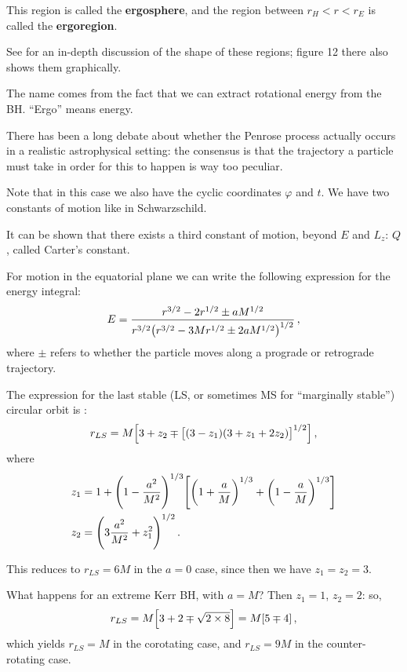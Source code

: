 \documentclass[main.tex]{subfiles}
\begin{document}
This region is called the \textbf{ergosphere}, and the region between \(r_H < r < r_E\) is called the \textbf{ergoregion}. 

See \textcite[sec. 3]{heinickeSchwarzschildKerrSolutions2015} for an in-depth discussion of the shape of these regions; figure 12 there also shows them graphically. 

The name comes from the fact that we can extract rotational energy from the BH. 
``Ergo'' means energy. 

There has been a long debate about whether the Penrose process actually occurs in a realistic astrophysical setting: the consensus is that the trajectory a particle must take in order for this to happen is way too peculiar. 

Note that in this case we also have the cyclic coordinates \(\varphi \) and \(t\). We have two constants of motion like in Schwarzschild. 

It can be shown that there exists a third constant of motion, beyond \(E\) and \(L_z\): \(Q\), called Carter's constant. 

For motion in the equatorial plane we can write the following expression for the energy integral: 
%
\begin{align}
E = \frac{r^{3/2} - 2 r^{1/2} \pm a M^{1/2}}{r^{3/2} \qty(r^{3/2}- 3M r^{1/2} \pm 2a M^{1/2})^{1/2}}
\,,
\end{align}
%
where \(\pm\) refers to whether the particle moves along a prograde or retrograde trajectory.

The expression for the last stable (LS, or sometimes MS for ``marginally stable'') circular orbit is \cite[eq.
\ 28]{puglieseEquatorialCircularMotion2011}:
%
\begin{align}
r_{LS} = M \qty[ 3 + z_2 \mp \qty[(3 - z_1 ) (3 + z_1 +2z_2 )]^{1/2}]
\,,
\end{align}
%
where 
%
\begin{align}
z_1 &= 1 + \qty(1 - \frac{a^2}{M^2})^{1/3} \qty[\qty(1 + \frac{a}{M})^{1/3} + \qty(1 - \frac{a}{M})^{1/3}]  \\
z_2 &= \qty(3 \frac{a^2}{M^2} + z_1^2)^{1/2}
\,.
\end{align}

This reduces to \(r_{LS} = 6 M\) in the \(a = 0\) case, since then we have \(z_1 = z_2 = 3\). 

What happens for an extreme Kerr BH, with \(a = M\)? 
Then \(z_1 = 1\), \(z_2 = 2\): so, 
%
\begin{align}
r_{LS} = M \qty[3 + 2 \mp \sqrt{2 \times 8}] = M \qty[5 \mp 4]
\,,
\end{align}
%
which yields \(r_{LS} = M\) in the corotating case, and \(r_{LS} = 9M\) in the counter-rotating case.
\end{document}
